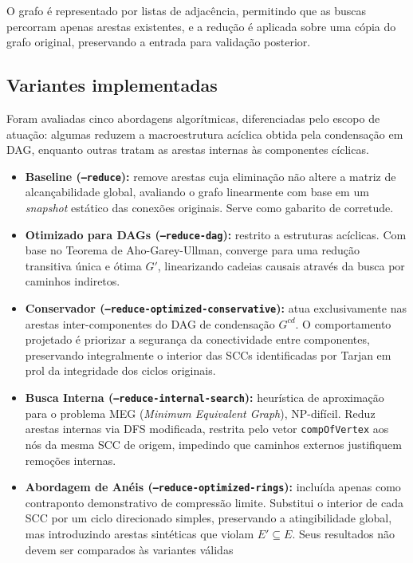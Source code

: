 \documentclass{sbc2023}%
\begin{document}
O grafo é representado por listas de adjacência, permitindo que 
as buscas percorram apenas arestas existentes, e a redução é 
aplicada sobre uma cópia do grafo original, preservando a 
entrada para validação posterior.

\subsection{Variantes implementadas}

Foram avaliadas cinco abordagens algorítmicas, diferenciadas pelo escopo de atuação: algumas reduzem a macroestrutura acíclica obtida pela condensação em DAG, enquanto outras tratam as arestas internas às componentes cíclicas.

\begin{itemize}
    \item \textbf{Baseline (\texttt{--reduce}):} remove arestas cuja eliminação
    não altere a matriz de alcançabilidade global, avaliando o grafo linearmente
    com base em um \textit{snapshot} estático das conexões originais. Serve como
    gabarito de corretude.

    \item \textbf{Otimizado para DAGs (\texttt{--reduce-dag}):} restrito a
    estruturas acíclicas. Com base no Teorema de Aho-Garey-Ullman, converge para
    uma redução transitiva única e ótima $G'$, linearizando cadeias causais
    através da busca por caminhos indiretos.

    \item \textbf{Conservador (\texttt{--reduce-optimized-conservative}):} atua
    exclusivamente nas arestas inter-componentes do DAG de condensação $G^{cd}$.
    O comportamento projetado é priorizar a segurança da conectividade
    entre componentes, preservando integralmente o interior das SCCs identificadas
    por Tarjan em prol da integridade dos ciclos originais.

    \item \textbf{Busca Interna (\texttt{--reduce-internal-search}):} heurística
    de aproximação para o problema MEG (\textit{Minimum Equivalent Graph}),
    NP-difícil. Reduz arestas internas via DFS modificada, restrita pelo vetor
    \texttt{compOfVertex} aos nós da mesma SCC de origem, impedindo que caminhos
    externos justifiquem remoções internas.

    \item \textbf{Abordagem de Anéis (\texttt{--reduce-optimized-rings}):}
    incluída apenas como contraponto demonstrativo de compressão limite. Substitui
    o interior de cada SCC por um ciclo direcionado simples, preservando a
    atingibilidade global, mas introduzindo arestas sintéticas que violam
    $E' \subseteq E$. Seus resultados não devem ser comparados às variantes
    válidas
\end{itemize}
\end{document}

